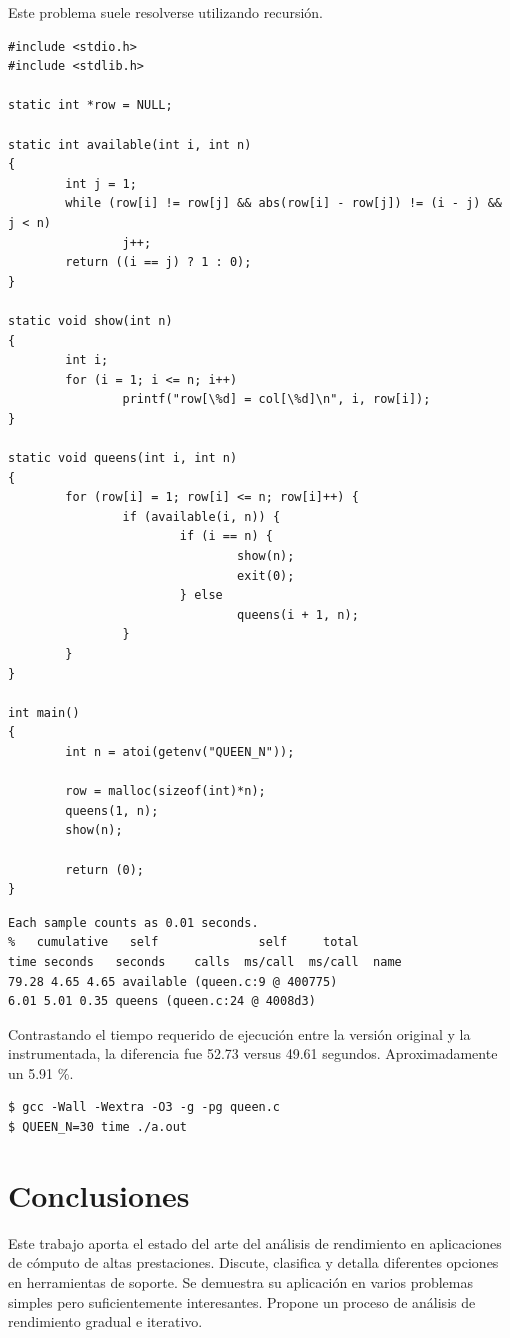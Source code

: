 \documentclass[a4paper]{report}
\begin{document}
Este problema suele resolverse utilizando recursión.

\begin{lstlisting}
#include <stdio.h>
#include <stdlib.h>

static int *row = NULL;

static int available(int i, int n)
{
        int j = 1;
        while (row[i] != row[j] && abs(row[i] - row[j]) != (i - j) && j < n)
                j++;
        return ((i == j) ? 1 : 0);
}

static void show(int n)
{
        int i;
        for (i = 1; i <= n; i++)
                printf("row[\%d] = col[\%d]\n", i, row[i]);
}

static void queens(int i, int n)
{
        for (row[i] = 1; row[i] <= n; row[i]++) {
                if (available(i, n)) {
                        if (i == n) {
                                show(n);
                                exit(0);
                        } else
                                queens(i + 1, n);
                }
        }
}

int main()
{
        int n = atoi(getenv("QUEEN_N"));

        row = malloc(sizeof(int)*n);
        queens(1, n);
        show(n);

        return (0);
}
\end{lstlisting}

\begin{lstlisting}
Each sample counts as 0.01 seconds.
%   cumulative   self              self     total
time seconds   seconds    calls  ms/call  ms/call  name
79.28 4.65 4.65 available (queen.c:9 @ 400775)
6.01 5.01 0.35 queens (queen.c:24 @ 4008d3)
\end{lstlisting}

Contrastando el tiempo requerido de ejecución entre la versión original y la instrumentada, la diferencia fue 52.73 versus 49.61 segundos. Aproximadamente un 5.91 \%.

\begin{lstlisting}
$ gcc -Wall -Wextra -O3 -g -pg queen.c
$ QUEEN_N=30 time ./a.out
\end{lstlisting}

\chapter{Conclusiones}\label{chapter:conclusions}

Este trabajo aporta el estado del arte del análisis de rendimiento en
aplicaciones de cómputo de altas prestaciones. Discute, clasifica y detalla
diferentes opciones en herramientas de soporte. Se demuestra su aplicación
en varios problemas simples pero suficientemente interesantes. Propone un
proceso de análisis de rendimiento gradual e iterativo.
\end{document}
